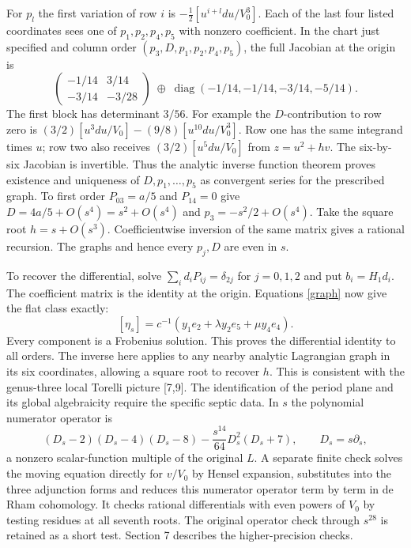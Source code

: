 \documentclass[10pt]{article}
\begin{document}
For $p_l$ the first variation of row $i$ is $-\frac12[u^{i+l}du/V_0^3]$. Each of the last four listed coordinates sees one of $p_1,p_2,p_4,p_5$ with nonzero coefficient. In the chart just specified and column order $(p_3,D,p_1,p_2,p_4,p_5)$, the full Jacobian at the origin is
\[
 \begin{pmatrix}-1/14&3/14\\-3/14&-3/28\end{pmatrix}
 \;\oplus\;\operatorname{diag}(-1/14,-1/14,-3/14,-5/14).
\]
The first block has determinant $3/56$.
For example the $D$-contribution to row zero is
$(3/2)[u^3du/V_0]-(9/8)[u^{10}du/V_0^3]$.
Row one has the same integrand times $u$; row two also receives $(3/2)[u^5du/V_0]$ from $z=u^2+hv$. The six-by-six Jacobian is invertible. Thus the analytic inverse function theorem proves existence and uniqueness of $D,p_1,\ldots,p_5$ as convergent series for the prescribed graph. To first order $P_{03}=a/5$ and $P_{14}=0$ give $D=4a/5+O(s^4)=s^2+O(s^4)$ and $p_3=-s^2/2+O(s^4)$. Take the square root $h=s+O(s^3)$. Coefficientwise inversion of the same matrix gives a rational recursion. The graphs and hence every $p_j,D$ are even in $s$.

To recover the differential, solve $\sum_i d_iP_{ij}=\delta_{2j}$ for $j=0,1,2$ and put $b_i=H_1d_i$. The coefficient matrix is the identity at the origin. Equations \eqref{graph} now give the flat class exactly:
\[
 [\eta_s]=c^{-1}(y_1 e_2+\lambda y_2 e_5+\mu y_4 e_4).
\]
Every component is a Frobenius solution. This proves the differential identity to all orders. The inverse here applies to any nearby analytic Lagrangian graph in its six coordinates, allowing a square root to recover $h$. This is consistent with the genus-three local Torelli picture [7,9]. The identification of the period plane and its global algebraicity require the specific septic data. In $s$ the polynomial numerator operator is
\[
 (D_s-2)(D_s-4)(D_s-8)-\frac{s^{14}}{64}D_s^2(D_s+7),\qquad D_s=s\partial_s ,
\]
a nonzero scalar-function multiple of the original $L$. A separate finite check solves the moving equation directly for $v/V_0$ by Hensel expansion, substitutes into the three adjunction forms and reduces this numerator operator term by term in de Rham cohomology. It checks rational differentials with even powers of $V_0$ by testing residues at all seventh roots. The original operator check through $s^{28}$ is retained as a short test. Section 7 describes the higher-precision checks.
\end{document}
